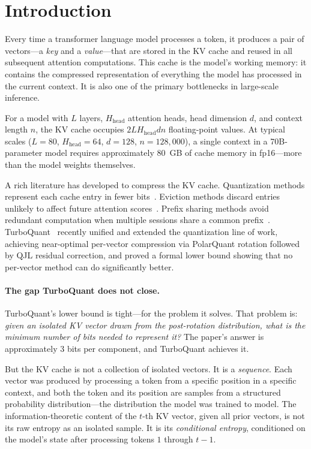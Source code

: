 \documentclass[11pt]{article}
\begin{document}
\section{Introduction}

Every time a transformer language model processes a token, it produces a pair of
vectors---a \emph{key} and a \emph{value}---that are stored in the KV cache and
reused in all subsequent attention computations.  This cache is the model's
working memory: it contains the compressed representation of everything the model
has processed in the current context.  It is also one of the primary bottlenecks
in large-scale inference.

For a model with $L$ layers, $H_{\mathrm{head}}$ attention heads, head dimension $d$, and context
length $n$, the KV cache occupies $2LH_{\mathrm{head}}dn$ floating-point values.  At typical
scales ($L{=}80$, $H_{\mathrm{head}}{=}64$, $d{=}128$, $n{=}128{,}000$), a single context in
a 70B-parameter model requires approximately 80~GB of cache memory in fp16---more
than the model weights themselves.

A rich literature has developed to compress the KV cache.  Quantization methods
represent each cache entry in fewer bits~\cite{liu2024kivi,hooper2024kvquant}.
Eviction methods discard entries unlikely to affect future attention
scores~\cite{zhang2023h2o,li2024snapkv}.  Prefix sharing methods avoid
redundant computation when multiple sessions share a common
prefix~\cite{pope2023,kwon2023vllm}.  TurboQuant~\cite{turbo2026} recently
unified and extended the quantization line of work, achieving near-optimal
per-vector compression via PolarQuant rotation followed by QJL residual
correction, and proved a formal lower bound showing that no per-vector method
can do significantly better.

\paragraph{The gap TurboQuant does not close.}
TurboQuant's lower bound is tight---for the problem it solves.  That problem is:
\emph{given an isolated KV vector drawn from the post-rotation distribution,
what is the minimum number of bits needed to represent it?}  The paper's answer
is approximately 3 bits per component, and TurboQuant achieves it.

But the KV cache is not a collection of isolated vectors.  It is a
\emph{sequence}.  Each vector was produced by processing a token from a specific
position in a specific context, and both the token and its position are samples
from a structured probability distribution---the distribution the model was
trained to model.  The information-theoretic content of the $t$-th KV vector,
given all prior vectors, is not its raw entropy as an isolated sample.  It is its
\emph{conditional entropy}, conditioned on the model's state after processing
tokens $1$ through $t-1$.
\end{document}
